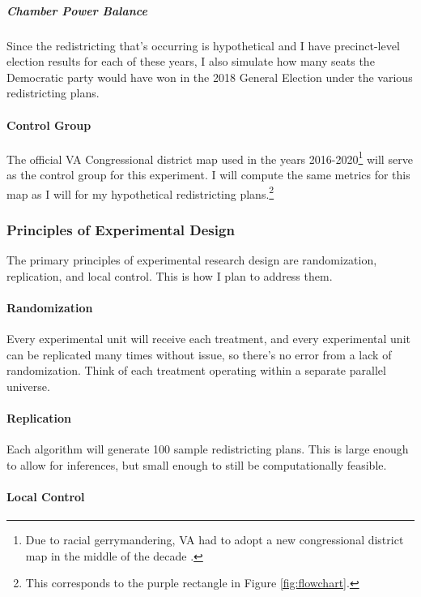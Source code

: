 \subparagraph{Chamber Power Balance}

Since the redistricting that's occurring is hypothetical and I have precinct-level election results for each of these years, I also simulate how many seats the Democratic party would have won in the 2018 General Election under the various redistricting plans. 

\paragraph{Control Group}

The official VA Congressional district map used in the years 2016-2020\footnote{Due to racial gerrymandering, VA had to adopt a new congressional district map in the middle of the decade \parencite{2016a}.} will serve as the control group for this experiment. I will compute the same metrics for this map as I will for my hypothetical redistricting plans.\footnote{This corresponds to the purple rectangle in Figure \ref{fig:flowchart}.}

\subsubsection{Principles of Experimental Design}

The primary principles of experimental research design are randomization, replication, and local control. This is how I plan to address them. 

\paragraph{Randomization}

Every experimental unit will receive each treatment, and every experimental unit can be replicated many times without issue, so there’s no error from a lack of randomization. Think of each treatment operating within a separate parallel universe. 

\paragraph{Replication}

Each algorithm will generate 100 sample redistricting plans. This is large enough to allow for inferences, but small enough to still be computationally feasible. 

\paragraph{Local Control}


